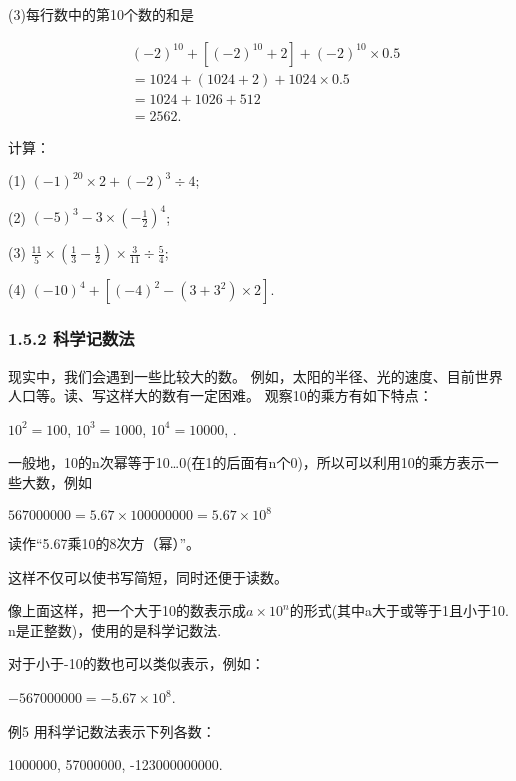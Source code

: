 \documentclass{article}
\begin{document}
\begin{example}
(3)每行数中的第10个数的和是

\begin{align}
    &(-2)^{10}+[(-2)^{10}+2]+(-2)^{10}\times0.5 \\
    &=1024+(1024+2)+1024\times0.5 \\
    &=1024+1026+512 \\
    &=2562.
\end{align}

\begin{exercise}
    计算：

    (1) $(-1)^{20}\times2+(-2)^3\div4$;

    (2) $ (-5)^3-3\times(-\frac{1}{2})^4$;

    (3) $ \frac{11}{5}\times(\frac{1}{3}-\frac{1}{2})\times\frac{3}{11}\div\frac{5}{4}$;
    
    (4) $ (-10)^4+[(-4)^2-(3+3^2)\times2] $.
\end{exercise}

\subsubsection{1.5.2 科学记数法}

现实中，我们会遇到一些比较大的数。 例如，太阳的半径、光的速度、目前世界人口等。读、写这样大的数有一定困难。
观察10的乘方有如下特点：

{$10^2=100$, $ 10^3=1000 $, $ 10^4=10000 $, \cdots.}

一般地，10的n次幂等于10\dots 0(在1的后面有n个0)，所以可以利用10的乘方表示一些大数，例如

$567000000=5.67\times100000000=5.67\times10^{8}$

读作“5.67乘10的8次方（幂）”。

这样不仅可以使书写简短，同时还便于读数。

\begin{definition}

像上面这样，把一个大于10的数表示成$a\times10^{n}$的形式(其中a大于或等于1且小于10. n是正整数)，使用的是科学记数法.

\end{definition}   

对于小于-10的数也可以类似表示，例如：

$ -567000000=-5.67\times10^{8} $.

\begin{example}

例5 用科学记数法表示下列各数：

1000000, 57000000, -123000000000.


\end{example}
\end{example}
\end{document}
